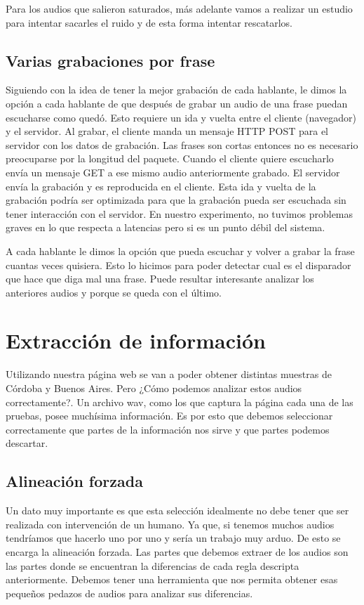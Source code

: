 \documentclass[11pt,a4paper,twoside]{tesis}
\begin{document}
Para los audios que salieron saturados, más adelante vamos a realizar un estudio para intentar sacarles el ruido y de esta forma intentar rescatarlos.

\section{Varias grabaciones por frase}

Siguiendo con la idea de tener la mejor grabación de cada hablante, le dimos la opción a cada hablante de que después de grabar un audio de una frase puedan escucharse como quedó. Esto requiere un ida y vuelta entre el cliente (navegador) y el servidor. Al grabar, el cliente manda un mensaje HTTP POST para el servidor con los datos de grabación. Las frases son cortas entonces no es necesario preocuparse por la longitud del paquete. Cuando el cliente quiere escucharlo envía un mensaje GET a ese mismo audio anteriormente grabado. El servidor envía la grabación y es reproducida en el cliente. Esta ida y vuelta de la grabación podría ser optimizada para que la grabación pueda ser escuchada sin tener interacción con el servidor. En nuestro experimento, no tuvimos problemas graves en lo que respecta a latencias pero si es un punto débil del sistema.

A cada hablante le dimos la opción que pueda escuchar y volver a grabar la frase cuantas veces quisiera. Esto lo hicimos para poder detectar cual es el disparador que hace que diga mal una frase. Puede resultar interesante analizar los anteriores audios y porque se queda con el último.

\chapter{Extracción de información}

Utilizando nuestra página web se van a poder obtener distintas muestras de Córdoba y Buenos Aires. Pero ¿Cómo podemos analizar estos audios correctamente?. Un archivo wav, como los que captura la página cada una de las pruebas, posee muchísima información. Es por esto que debemos seleccionar correctamente que partes de la información nos sirve y que partes podemos descartar. 

\section{Alineación forzada}

Un dato muy importante es que esta selección idealmente no debe tener que ser realizada con intervención de un humano. Ya que, si tenemos muchos audios tendríamos que hacerlo uno por uno y sería un trabajo muy arduo. De esto se encarga la alineación forzada. Las partes que debemos extraer de los audios son las partes donde se encuentran la diferencias de cada regla descripta anteriormente. Debemos tener una herramienta que nos permita obtener esas pequeños pedazos de audios para analizar sus diferencias. 
\end{document}
